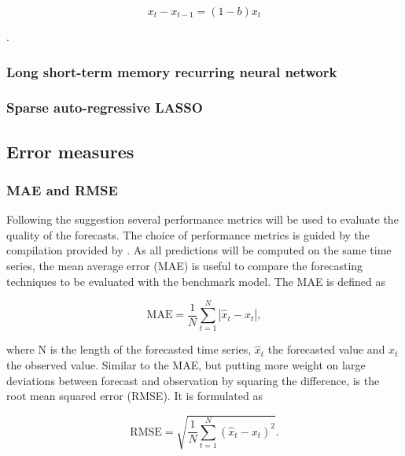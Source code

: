 \begin{equation} \label{Eq:ARIMA}
x_t-x_{t-1}=(1-b)x_t
\end{equation}

\citep{Box:1990}.


\subsubsection{Long short-term memory recurring neural network}



\subsubsection{Sparse auto-regressive LASSO}




\subsection{Error measures}\label{Sec:Method;Subsec:Error}


\subsubsection{MAE and RMSE}

Following the suggestion \citet{Hoff:2013} several performance metrics will be used to evaluate the quality of the forecasts. The choice of performance metrics is guided by the compilation provided by \citet{Meer:2018}.
As all predictions will be computed on the same time series, the mean average error (MAE) is useful to compare the forecasting techniques to be evaluated with the benchmark model. The MAE is defined as

\begin{equation} \label{Eq:MAE}
\text{MAE}=\frac{1}{N}\sum_{t=1}^N\left|\widehat{x}_t-x_t\right|,    
\end{equation}

where N is the length of the forecasted time series, $\widehat{x}_t$ the forecasted value and $x_t$ the observed value. Similar to the MAE, but putting more weight on large deviations between forecast and observation by squaring the difference, is the root mean squared error (RMSE). It is formulated as

\begin{equation} \label{Eq:RMSE}
\text{RMSE}=\sqrt{\frac{1}{N}\sum_{t=1}^N\left(\widehat{x}_t-x_t\right)^2}.
\end{equation}





